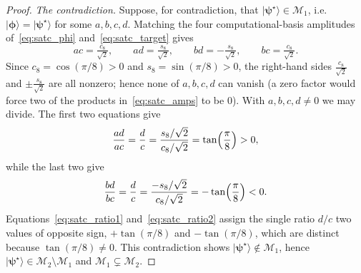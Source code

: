 \documentclass[10pt,a4paper]{amsart}
\newcommand{\cM}{\mathcal{M}}
\begin{document}
\begin{proof}
\emph{The contradiction.} Suppose, for contradiction, that
$|\boldsymbol{\psi}^\star\rangle\in\cM_1$, i.e.\
$|\boldsymbol{\phi}\rangle=|\boldsymbol{\psi}^\star\rangle$ for some $a,b,c,d$. Matching
the four computational-basis amplitudes
of~\eqref{eq:satc_phi} and~\eqref{eq:satc_target} gives
\begin{equation}\label{eq:satc_amps}
  ac=\tfrac{c_8}{\sqrt2},\qquad
  ad=\tfrac{s_8}{\sqrt2},\qquad
  bd=-\tfrac{s_8}{\sqrt2},\qquad
  bc=\tfrac{c_8}{\sqrt2}.
\end{equation}
Since $c_8=\cos(\pi/8)>0$ and $s_8=\sin(\pi/8)>0$, the right-hand sides
$\tfrac{c_8}{\sqrt2}$ and $\pm\tfrac{s_8}{\sqrt2}$ are all nonzero;
hence none of $a,b,c,d$ can vanish (a zero factor would force two of
the products in~\eqref{eq:satc_amps} to be $0$). With $a,b,c,d\neq0$ we
may divide. The first two equations give
\begin{equation}\label{eq:satc_ratio1}
  \frac{ad}{ac}=\frac{d}{c}
  =\frac{s_8/\sqrt2}{c_8/\sqrt2}
  =\tan \Bigl(\frac\pi8\Bigr)>0,
\end{equation}
while the last two give
\begin{equation}\label{eq:satc_ratio2}
  \frac{bd}{bc}=\frac{d}{c}
  =\frac{-s_8/\sqrt2}{c_8/\sqrt2}
  =-\tan \Bigl(\frac\pi8\Bigr)<0.
\end{equation}
Equations~\eqref{eq:satc_ratio1} and~\eqref{eq:satc_ratio2} assign the
single ratio $d/c$ two values of opposite sign,
$+\tan(\pi/8)$ and $-\tan(\pi/8)$, which are distinct because
$\tan(\pi/8)\neq0$. This contradiction shows
$|\boldsymbol{\psi}^\star\rangle\notin\cM_1$, hence
$|\boldsymbol{\psi}^\star\rangle\in\cM_2\setminus\cM_1$ and
$\cM_1\subsetneq\cM_2$.


\end{proof}
\end{document}
